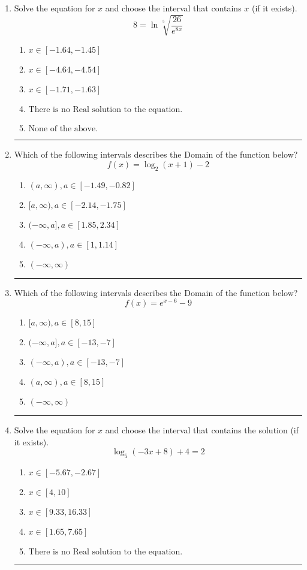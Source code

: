 \documentclass[14pt]{extbook}
\newcommand{\litem}[1]{\item#1\hspace*{-1cm}\rule{\textwidth}{0.4pt}}
\begin{document}
\begin{enumerate}
{\begin{enumerate}[label=\Alph*.]
\end{enumerate} }
\litem{
 Solve the equation for $x$ and choose the interval that contains $x$ (if it exists).\[  8 = \ln{\sqrt[5]{\frac{26}{e^{8x}}}} \]\begin{enumerate}[label=\Alph*.]
\item \( x \in [-1.64, -1.45] \)
\item \( x \in [-4.64, -4.54] \)
\item \( x \in [-1.71, -1.63] \)
\item \( \text{There is no Real solution to the equation.} \)
\item \( \text{None of the above.} \)

\end{enumerate} }
\litem{
Which of the following intervals describes the Domain of the function below?\[ f(x) = \log_2{(x+1)}-2 \]\begin{enumerate}[label=\Alph*.]
\item \( (a, \infty), a \in [-1.49, -0.82] \)
\item \( [a, \infty), a \in [-2.14, -1.75] \)
\item \( (-\infty, a], a \in [1.85, 2.34] \)
\item \( (-\infty, a), a \in [1, 1.14] \)
\item \( (-\infty, \infty) \)

\end{enumerate} }
\litem{
Which of the following intervals describes the Domain of the function below?\[ f(x) = e^{x-6}-9 \]\begin{enumerate}[label=\Alph*.]
\item \( [a, \infty), a \in [8, 15] \)
\item \( (-\infty, a], a \in [-13, -7] \)
\item \( (-\infty, a), a \in [-13, -7] \)
\item \( (a, \infty), a \in [8, 15] \)
\item \( (-\infty, \infty) \)

\end{enumerate} }
\litem{
Solve the equation for $x$ and choose the interval that contains the solution (if it exists).\[ \log_{5}{(-3x+8)}+4 = 2 \]\begin{enumerate}[label=\Alph*.]
\item \( x \in [-5.67, -2.67] \)
\item \( x \in [4, 10] \)
\item \( x \in [9.33, 16.33] \)
\item \( x \in [1.65, 7.65] \)
\item \( \text{There is no Real solution to the equation.} \)


\end{enumerate}}
\end{enumerate}
\end{document}
